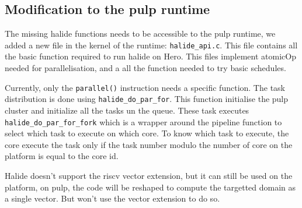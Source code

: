 	\subsection{Modification to the \gls{pulp} runtime}
	The missing halide functions needs to be accessible to the pulp runtime, we added a new file in the kernel of the runtime: \texttt{halide\_api.c}. This file contains all the basic function required to run halide on Hero. This files implement \gls{atomicOp} needed for parallelisation, and a all the function needed to try basic schedules.

	Currently, only the \texttt{parallel()} instruction needs a specific function. The task distribution is done using \texttt{halide\_do\_par\_for}. This function initialise the \gls{pulp} cluster and initialize all the tasks un the queue. These task executes \texttt{halide\_do\_par\_for\_fork} which is a wrapper around the pipeline function to select which task to execute on which core. To know which task to execute, the core execute the task only if the task number modulo the number of core on the platform is equal to the core id.

	Halide doesn't support the \gls{riscv} vector extension, but it can still be used on the platform, on \gls{pulp}, the code will be reshaped to compute the targetted domain as a single vector. But won't use the vector extension to do so.



